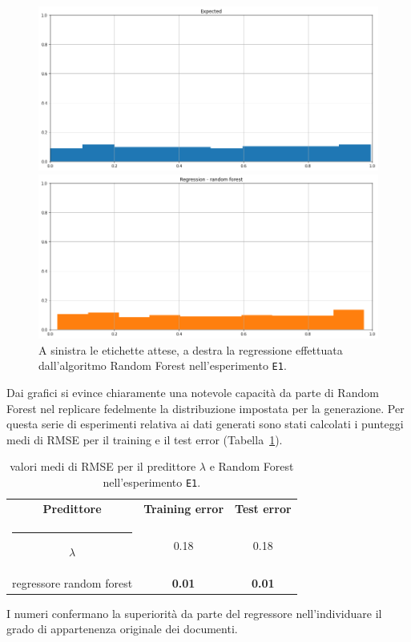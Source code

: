 \documentclass[12pt]{report}
\makeatletter
\theoremstyle{definition}
\newcommand{\thickhline}{%
    \noalign {\ifnum 0=`}\fi \hrule height 1pt
    \futurelet \reserved@a \@xhline
}
\makeatother
\begin{document}
\begin{figure}
\centering
    \begin{minipage}{0.48\textwidth}
        \includegraphics[width=\linewidth]{images/experiment_uniform_disgiunti/expected_memberships.png}
    \end{minipage}
    \begin{minipage}{0.48\textwidth}
        \includegraphics[width=\linewidth]{images/experiment_uniform_disgiunti/prediction_regression_rf.png}
    \end{minipage}
    \caption{A sinistra le etichette attese, a destra la regressione effettuata dall'algoritmo Random Forest nell'esperimento \texttt{E1}.}
    \label{rf_exp1}
\end{figure} 
Dai grafici si evince chiaramente una notevole capacità da parte di Random Forest nel replicare fedelmente la distribuzione impostata per la generazione.
Per questa serie di esperimenti relativa ai dati generati sono stati calcolati i punteggi medi di RMSE per il training e il test error (Tabella~\ref{rmse_exp1}). 
\begin{table}
\centering
\begin{adjustbox}{max width=\textwidth}
 \begin{tabular}{|c|c|c|} 
 \hline
\textbf{Predittore} & \textbf{Training error} & \textbf{Test error}
\\ [0.5ex] 
 \thickhline
 $\lambda$ & 0.18 & 0.18 \\
 regressore random forest & \textbf{0.01} & \textbf{0.01}
 \\
 \hline
\end{tabular}
\end{adjustbox}
\caption{valori medi di RMSE per il predittore $\lambda$ e Random Forest nell'esperimento \texttt{E1}.}
\label{rmse_exp1}
\end{table}
I numeri confermano la superiorità da parte del regressore nell'individuare il grado di appartenenza originale dei documenti.
\end{document}
